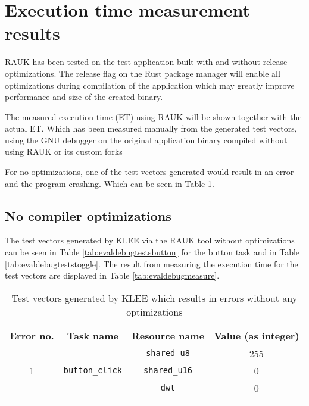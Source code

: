 

\section{Execution time measurement results}
RAUK has been tested on the test application built with and without release
optimizations. The release flag on the Rust package manager will enable all
optimizations during compilation of the application which may greatly improve
performance and size of the created binary.

The measured execution time (ET) using RAUK will be shown together with the
actual ET. Which has been measured manually from the generated test vectors,
using the GNU debugger on the original application binary compiled without
using RAUK or its custom forks

For no optimizations, one of the test vectors generated would result in an
error and the program crashing. Which can be seen in Table \ref{tab:evaldebugtestsbuttonerror}.

\subsection{No compiler optimizations}
The test vectors generated by KLEE via the RAUK tool without optimizations can
be seen in Table \ref{tab:evaldebugtestsbutton} for the button task and in
Table \ref{tab:evaldebugteststoggle}. The result from measuring the execution
time for the test vectors are displayed in Table \ref{tab:evaldebugmeasure}.


\begin{longtable}{|c|c|c|c|}
\hline
Error no. & Task name & Resource name & Value (as integer) \\ \hline
\multirow{3}{*}{1} & \multirow{3}{*}{\texttt{button\_click}} & \texttt{shared\_u8}  & 255 \\ \cline{3-4}
                   &                                         & \texttt{shared\_u16} & 0 \\ \cline{3-4}
                   &                                         & \texttt{dwt}         & 0 \\ \hline
\caption{Test vectors generated by KLEE which results in errors without any optimizations}
\label{tab:evaldebugtestsbuttonerror}
\end{longtable}

